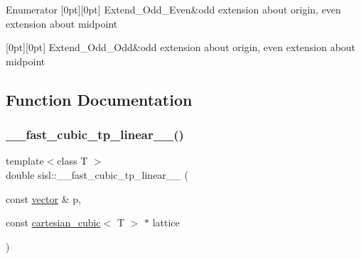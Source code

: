 \begin{DoxyEnumFields}{Enumerator}
[0pt][0pt]{}\mbox{\label{namespacesisl_aaf1f41d23ed37dacaa4c9f1bb6d3324fa7f5a23d007bce2170e4aa405b7a0829e}} 
Extend\+\_\+\+Odd\+\_\+\+Even&odd extension about origin, even extension about midpoint \\
\hline

[0pt][0pt]{}\mbox{\label{namespacesisl_aaf1f41d23ed37dacaa4c9f1bb6d3324fa1ba3dc19cdffc9a67e046e50e1e64187}} 
Extend\+\_\+\+Odd\+\_\+\+Odd&odd extension about origin, even extension about midpoint \\
\hline

\end{DoxyEnumFields}


\subsection{Function Documentation}
\mbox{\label{namespacesisl_a41665c7664aae419e4fa4154c7b2acc8}} 
\subsubsection{\texorpdfstring{\+\_\+\+\_\+fast\+\_\+cubic\+\_\+tp\+\_\+linear\+\_\+\+\_\+()}{\_\_fast\_cubic\_tp\_linear\_\_()}}
{\footnotesize\ttfamily template$<$class T $>$ \\
double sisl\+::\+\_\+\+\_\+fast\+\_\+cubic\+\_\+tp\+\_\+linear\+\_\+\+\_\+ (\begin{DoxyParamCaption}\item[{const \hyperlink{namespacesisl_a2069bd5374a9be042ff3ce3306d41e1a}{vector} \&}]{p,  }\item[{const \hyperlink{classsisl_1_1cartesian__cubic}{cartesian\+\_\+cubic}$<$ T $>$ $\ast$}]{lattice }\end{DoxyParamCaption})\hspace{0.3cm}{\ttfamily [inline]}}

